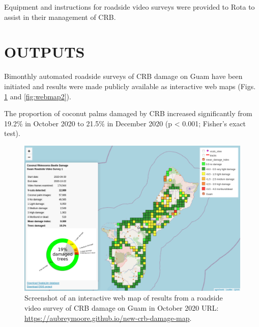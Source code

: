 \documentclass[12pt,letterpaper,english,bibliography=totocnumbered,abstract=on]{scrartcl}
\begin{document}
Equipment and instructions for roadside video surveys were provided to Rota to assist in their management of CRB.

\section{OUTPUTS} 

%
%
%
%
%
%

Bimonthly automated roadside surveys of CRB damage on Guam have been initiated and results were made publicly available as interactive web maps (Figs. \ref{fig:webmap1} and \ref{fig:webmap2}). 

The proportion of coconut palms damaged by CRB increased significantly from 19.2\% in October 2020 to 21.5\% in December 2020 (p < 0.001; Fisher's exact test). 

\begin{figure}[p]
	\centering
	\includegraphics[width=0.75\linewidth]{images/crb-webmap-2020-10.png}
	\caption{Screenshot of an interactive web map of results from a roadside video survey of CRB damage on Guam in October 2020 URL: \url{https://aubreymoore.github.io/new-crb-damage-map}.}
	\label{fig:webmap1}
\end{figure}
\end{document}
